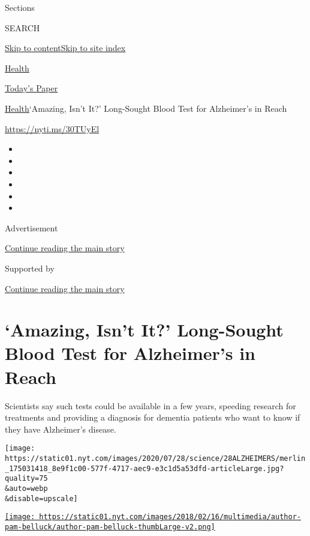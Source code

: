 Sections

SEARCH

\protect\hyperlink{site-content}{Skip to
content}\protect\hyperlink{site-index}{Skip to site index}

\href{https://www.nytimes.com/section/health}{Health}

\href{https://myaccount.nytimes.com/auth/login?response_type=cookie\&client_id=vi}{}

\href{https://www.nytimes.com/section/todayspaper}{Today's Paper}

\href{/section/health}{Health}\textbar{}`Amazing, Isn't It?' Long-Sought
Blood Test for Alzheimer's in Reach

\url{https://nyti.ms/30TUyEl}

\begin{itemize}
\item
\item
\item
\item
\item
\item
\end{itemize}

Advertisement

\protect\hyperlink{after-top}{Continue reading the main story}

Supported by

\protect\hyperlink{after-sponsor}{Continue reading the main story}

\hypertarget{amazing-isnt-it-long-sought-blood-test-for-alzheimers-in-reach}{%
\section{`Amazing, Isn't It?' Long-Sought Blood Test for Alzheimer's in
Reach}\label{amazing-isnt-it-long-sought-blood-test-for-alzheimers-in-reach}}

Scientists say such tests could be available in a few years, speeding
research for treatments and providing a diagnosis for dementia patients
who want to know if they have Alzheimer's disease.

\texttt{[image: https://static01.nyt.com/images/2020/07/28/science/28ALZHEIMERS/merlin\_175031418\_8e9f1c00-577f-4717-aec9-e3c1d5a53dfd-articleLarge.jpg?quality=75\\\&auto=webp\\\&disable=upscale]}

\href{https://www.nytimes.com/by/pam-belluck}{\texttt{[image: https://static01.nyt.com/images/2018/02/16/multimedia/author-pam-belluck/author-pam-belluck-thumbLarge-v2.png]}}


